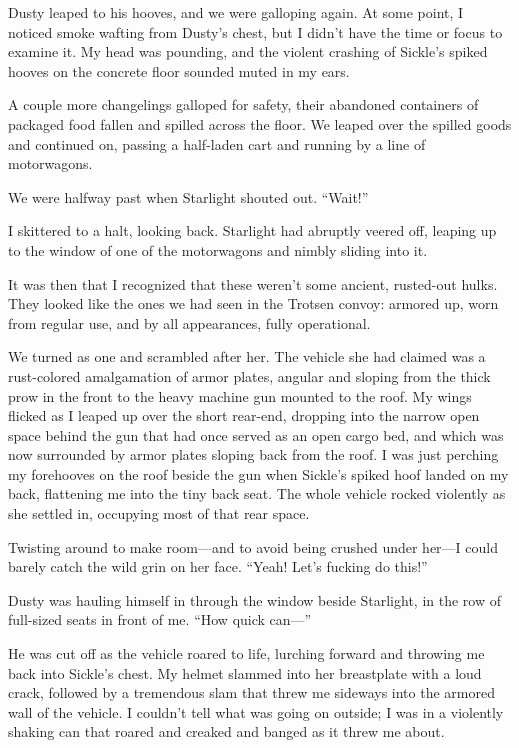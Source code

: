 Dusty leaped to his hooves, and we were galloping again. At some point, I noticed smoke wafting from Dusty’s chest, but I didn’t have the time or focus to examine it. My head was pounding, and the violent crashing of Sickle’s spiked hooves on the concrete floor sounded muted in my ears.

A couple more changelings galloped for safety, their abandoned containers of packaged food fallen and spilled across the floor. We leaped over the spilled goods and continued on, passing a half-laden cart and running by a line of motorwagons.

We were halfway past when Starlight shouted out. “Wait!”

I skittered to a halt, looking back. Starlight had abruptly veered off, leaping up to the window of one of the motorwagons and nimbly sliding into it.

It was then that I recognized that these weren’t some ancient, rusted-out hulks. They looked like the ones we had seen in the Trotsen convoy: armored up, worn from regular use, and by all appearances, fully operational.

We turned as one and scrambled after her. The vehicle she had claimed was a rust-colored amalgamation of armor plates, angular and sloping from the thick prow in the front to the heavy machine gun mounted to the roof. My wings flicked as I leaped up over the short rear-end, dropping into the narrow open space behind the gun that had once served as an open cargo bed, and which was now surrounded by armor plates sloping back from the roof. I was just perching my forehooves on the roof beside the gun when Sickle’s spiked hoof landed on my back, flattening me into the tiny back seat. The whole vehicle rocked violently as she settled in, occupying most of that rear space.

Twisting around to make room—and to avoid being crushed under her—I could barely catch the wild grin on her face. “Yeah! Let’s fucking do this!”

Dusty was hauling himself in through the window beside Starlight, in the row of full-sized seats in front of me. “How quick can—”

He was cut off as the vehicle roared to life, lurching forward and throwing me back into Sickle’s chest. My helmet slammed into her breastplate with a loud crack, followed by a tremendous slam that threw me sideways into the armored wall of the vehicle. I couldn’t tell what was going on outside; I was in a violently shaking can that roared and creaked and banged as it threw me about.

